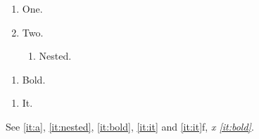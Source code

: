 \documentclass{article}
\begin{document}
\begin{enumerate}[label=(\alph*)]
\item One.\label{it:a}
\item Two.
\begin{enumerate}[label*=.\arabic*]
\item Nested.\label{it:nested}
\end{enumerate}
\end{enumerate}
\begin{enumerate}[label=\textbf{\arabic*.}]
\item Bold.\label{it:bold}
\end{enumerate}
\begin{enumerate}[label=\textit{\roman*}]
\item It.\label{it:it}
\end{enumerate}
See \ref{it:a}, \ref{it:nested}, \ref{it:bold}, \ref{it:it} and \ref{it:it}f, \textit{x \ref{it:bold}}.
\end{document}
